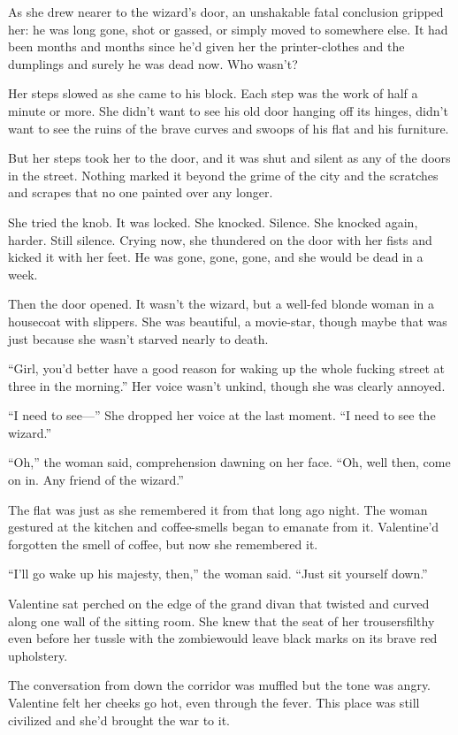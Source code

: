 As she drew nearer to the wizard’s door, an unshakable fatal
conclusion gripped her: he was long gone, shot or gassed, or simply
moved to somewhere else. It had been months and months since he’d
given her the printer-clothes and the dumplings and surely he was
dead now. Who wasn’t?

Her steps slowed as she came to his block. Each step was the work
of half a minute or more. She didn’t want to see his old door
hanging off its hinges, didn’t want to see the ruins of the brave
curves and swoops of his flat and his furniture.

But her steps took her to the door, and it was shut and silent as
any of the doors in the street. Nothing marked it beyond the grime
of the city and the scratches and scrapes that no one painted over
any longer.

She tried the knob. It was locked. She knocked. Silence. She
knocked again, harder. Still silence. Crying now, she thundered on
the door with her fists and kicked it with her feet. He was gone,
gone, gone, and she would be dead in a week.

Then the door opened. It wasn’t the wizard, but a well-fed blonde
woman in a housecoat with slippers. She was beautiful, a
movie-star, though maybe that was just because she wasn’t starved
nearly to death.

“Girl, you’d better have a good reason for waking up the whole
fucking street at three in the morning.” Her voice wasn’t unkind,
though she was clearly annoyed.

“I need to see---” She dropped her voice at the last moment. “I need
to see the wizard.”

“Oh,” the woman said, comprehension dawning on her face. “Oh, well
then, come on in. Any friend of the wizard.”

The flat was just as she remembered it from that long ago night.
The woman gestured at the kitchen and coffee-smells began to
emanate from it. Valentine’d forgotten the smell of coffee, but now
she remembered it.

“I’ll go wake up his majesty, then,” the woman said. “Just sit
yourself down.”

Valentine sat perched on the edge of the grand divan that twisted
and curved along one wall of the sitting room. She knew that the
seat of her trousers\dash{}filthy even before her tussle with the
zombie\dash{}would leave black marks on its brave red upholstery.

The conversation from down the corridor was muffled but the tone
was angry. Valentine felt her cheeks go hot, even through the
fever. This place was still civilized and she’d brought the war to
it.

